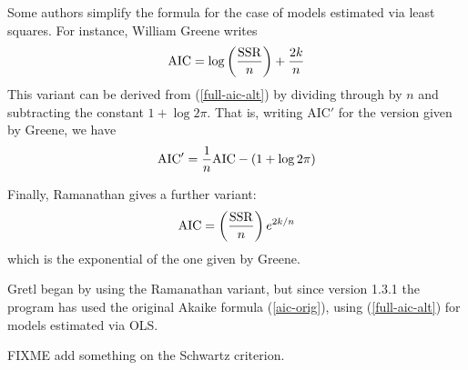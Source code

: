 Some authors simplify the formula for the case of models estimated
via least squares.  For instance, William Greene writes
%
\begin{equation}
\label{aic-greene}
{\rm AIC} = \log \left( \frac{\rm SSR}{n} \right) + \frac{2k}{n}
\end{equation}
%
This variant can be derived from (\ref{full-aic-alt}) by dividing
through by $n$ and subtracting the constant $1 + \log 2\pi$.  That is,
writing AIC$'$ for the version given by Greene, we have
%
\[
{\rm AIC}' = \frac{1}{n} {\rm AIC} - (1 + \log 2\pi)
\]
%

Finally, Ramanathan gives a further variant:
%
\[
{\rm AIC} = \left( \frac{\rm SSR}{n} \right) e^{2k/n}
\]
%
which is the exponential of the one given by Greene.  

Gretl began by using the Ramanathan variant, but since version 1.3.1
the program has used the original Akaike formula (\ref{aic-orig}),
using (\ref{full-aic-alt}) for models estimated via OLS.

FIXME add something on the Schwartz criterion.


